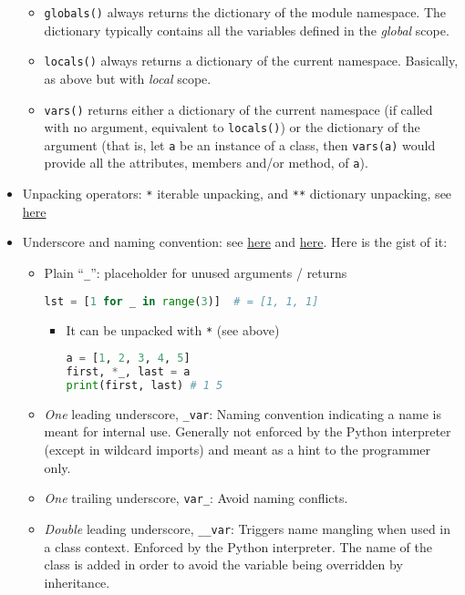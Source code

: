 \documentclass[a4paper,12pt,%
              final%
              ]{article}
\begin{document}
\begin{itemize}
    \begin{itemize}
      \item \verb|globals()| always returns the dictionary of the module namespace. The dictionary typically contains all the variables defined in the \emph{global} scope.
      \item \verb|locals()| always returns a dictionary of the current namespace. Basically, as above but with \emph{local} scope.
      \item \verb|vars()| returns either a dictionary of the current namespace (if called with no argument, equivalent to \verb|locals()|) or the dictionary of the argument (that is, let \verb|a| be an instance of a class, then \verb|vars(a)| would provide all the attributes, members and/or method, of \verb|a|).
    \end{itemize}
  \item Unpacking operators: \verb|*| iterable unpacking, and \verb|**| dictionary unpacking, see \href{https://geekflare.com/python-unpacking-operators/}{here}
  \item Underscore and naming convention: see \href{https://dbader.org/blog/meaning-of-underscores-in-python}{here} and \href{https://realpython.com/python-double-underscore/}{here}. Here is the gist of it:
    \begin{itemize}
      \item Plain ``\verb|_|'': placeholder for unused arguments / returns
\begin{lstlisting}[language=python]
lst = [1 for _ in range(3)]  # = [1, 1, 1]
\end{lstlisting}
        \begin{itemize}
          \item It can be unpacked with \verb|*| (see above)
\begin{lstlisting}[language=python]
a = [1, 2, 3, 4, 5]
first, *_, last = a
print(first, last) # 1 5
\end{lstlisting}
        \end{itemize}
      \item \emph{One} leading underscore, \verb|_var|: Naming convention indicating a name is meant for internal use. Generally not enforced by the Python interpreter (except in wildcard imports) and meant as a hint to the programmer only.
      \item \emph{One} trailing underscore, \verb|var_|: Avoid naming conflicts.
      \item \emph{Double} leading underscore, \verb|__var|: Triggers name mangling when used in a class context. Enforced by the Python interpreter. The name of the class is added in order to avoid the variable being overridden by inheritance.

\end{itemize}
\end{itemize}
\end{document}
